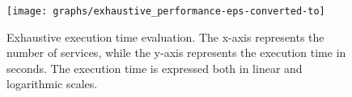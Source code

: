 


\begin{figure}
  \texttt{[image: graphs/exhaustive\_performance-eps-converted-to]}
  \caption{Exhaustive execution time evaluation. The x-axis represents the number of services, while the y-axis represents the execution time in seconds. The execution time is expressed both in linear and logarithmic scales.}
  \label{fig:perf_exhaustive}
\end{figure}





